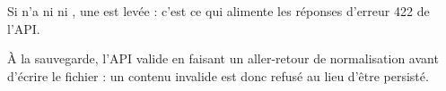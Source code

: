 Si  n'a ni  ni , une  est
levée : c'est ce qui alimente les réponses d'erreur 422 de l'API.

\begin{note}
À la sauvegarde, l'API valide en faisant un aller-retour de normalisation avant
d'écrire le fichier : un contenu invalide est donc refusé au lieu d'être
persisté.
\end{note}
